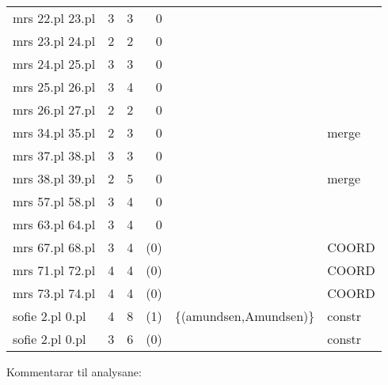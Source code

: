 \documentclass[11pt,a4paper,oneside,draft]{book}
\begin{document}
\begin{center}
\begin{tabular}{lrrrll}
 mrs 22.pl 23.pl  &      3  &      3  &            0  &                                                &          \\
 mrs 23.pl 24.pl  &      2  &      2  &            0  &                                                &          \\
 mrs 24.pl 25.pl  &      3  &      3  &            0  &                                                &          \\
 mrs 25.pl 26.pl  &      3  &      4  &            0  &                                                &          \\
 mrs 26.pl 27.pl  &      2  &      2  &            0  &                                                &          \\
 mrs 34.pl 35.pl  &      2  &      3  &            0  &                                                &  merge   \\
 mrs 37.pl 38.pl  &      3  &      3  &            0  &                                                &          \\
 mrs 38.pl 39.pl  &      2  &      5  &            0  &                                                &  merge   \\
 mrs 57.pl 58.pl  &      3  &      4  &            0  &                                                &          \\
 mrs 63.pl 64.pl  &      3  &      4  &            0  &                                                &          \\
 mrs 67.pl 68.pl  &      3  &      4  &          (0)  &                                                &  COORD   \\
 mrs 71.pl 72.pl  &      4  &      4  &          (0)  &                                                &  COORD   \\
 mrs 73.pl 74.pl  &      4  &      4  &          (0)  &                                                &  COORD   \\
 sofie 2.pl 0.pl  &      4  &      8  &          (1)  &  \{(amundsen,Amundsen)\}                       &  constr  \\
 sofie 2.pl 0.pl  &      3  &      6  &          (0)  &                                                &  constr  \\
\end{tabular}
\end{center}



Kommentarar til analysane:
\end{document}
